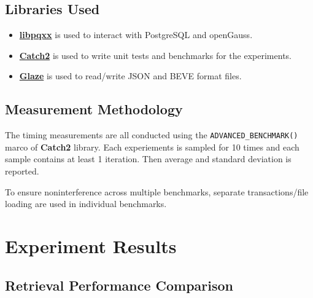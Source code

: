 \documentclass[14pt,a4paper]{article}
\begin{document}
    \subsection{Libraries Used}
    \begin{itemize}
        \item \href{https://github.com/jtv/libpqxx}{\textbf{libpqxx}} is used to interact with PostgreSQL and openGauss.
        \item \href{https://github.com/catchorg/Catch2/}{\textbf{Catch2}} is used to write unit tests and benchmarks for the experiments.
        \item \href{https://github.com/stephenberry/glaze/}{\textbf{Glaze}} is used to read/write JSON and BEVE format files.
    \end{itemize}
    
    \subsection{Measurement Methodology}
    
    The timing measurements are all conducted using the \texttt{ADVANCED\_BENCHMARK()} marco of \textbf{Catch2} library. Each experiements is sampled for 10 times and each sample contains at least 1 iteration. Then average and standard deviation is reported.
    
    To ensure noninterference across multiple benchmarks, separate transactions/file loading are used in individual benchmarks.
    
    \section{Experiment Results}
    \subsection{Retrieval Performance Comparison}
\end{document}
